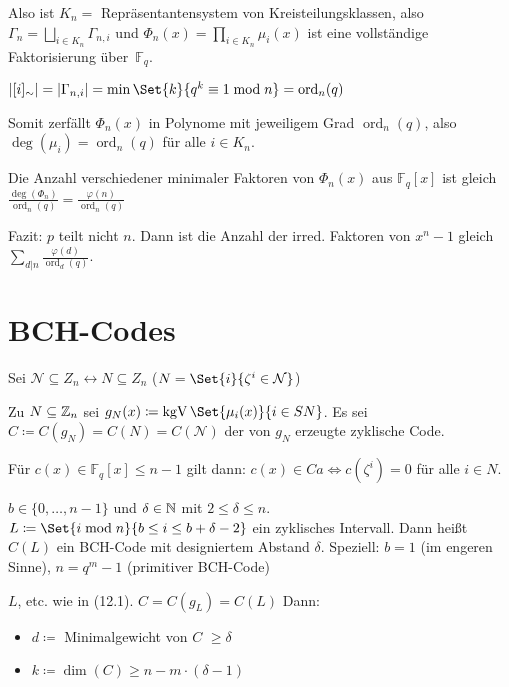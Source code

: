 \documentclass{cheat-sheet}
\newcommand{\F}{\mathbb{F}} %
\newcommand{\divides}{|} %
\DeclareMathOperator{\kgV}{kgV} %
\DeclareMathOperator{\ord}{ord} %
\begin{document}
Also ist $K_n = $ Repräsentantensystem von Kreisteilungsklassen, also $\Gamma_n = \bigsqcup_{i \in K_n} \Gamma_{n,i}$ und $\Phi_n(x) = \prod_{i \in K_n} \mu_i(x)$ ist eine vollständige Faktorisierung über~$\F_q$.

$\abs{[i]_\sim} = \abs{\Gamma_{n,i}} = \min \Set{k}{q^k \equiv 1 \bmod{n}} = \ord_n(q)$

Somit zerfällt $\Phi_n(x)$ in Polynome mit jeweiligem Grad $\ord_n(q)$, also $\deg(\mu_i) = \ord_n(q)$ für alle $i \in K_n$.

Die Anzahl verschiedener minimaler Faktoren von $\Phi_n(x)$ aus $\F_q[x]$ ist gleich $\tfrac{\deg(\Phi_n)}{\ord_n(q)} = \tfrac{\varphi(n)}{\ord_n(q)}$

Fazit: $p$ teilt nicht $n$. Dann ist die Anzahl der irred. Faktoren von $x^n - 1$ gleich $\sum_{d \divides n} \tfrac{\varphi(d)}{\ord_d(q)}$.



\section{BCH-Codes}


Sei $\mathcal{N} \subseteq Z_n \leftrightarrow N \subseteq Z_n$ ($N = \Set{i}{\zeta^i \in \mathcal{N}}$)

Zu $N \subseteq \mathbb{Z}_n$ sei $g_N(x) \coloneqq \kgV \Set{\mu_i(x)}{i \in SN}$.
Es sei $C \coloneqq C(g_N) = C(N) = C(\mathcal{N})$ der von $g_N$ erzeugte zyklische Code.

Für $c(x) \in \F_q[x]{\leq n-1}$ gilt dann: $c(x) \in Ca \iff c(\zeta^i) = 0$ für alle $i \in N$.

\begin{defn}
  $b \in \{ 0, \ldots, n-1 \}$ und $\delta \in \mathbb{N}$ mit $2 \leq \delta \leq n$.
  $L \coloneqq \Set{i \bmod{n}}{b \leq i \leq b + \delta - 2}$ ein zyklisches Intervall.
  Dann heißt $C(L)$ ein BCH-Code mit designiertem Abstand $\delta$.
  Speziell: $b=1$ (im engeren Sinne), $n = q^m - 1$ (primitiver BCH-Code)
\end{defn}

\begin{satz}
  $L$, etc. wie in (12.1).
  $C = C(g_L) = C(L)$
  Dann:
  \begin{itemize}
    \item $d \coloneqq $ Minimalgewicht von $C$ $\geq \delta$
    \item $k \coloneqq \dim(C) \geq n - m \cdot (\delta - 1)$
  \end{itemize}
\end{satz}

\end{document}
